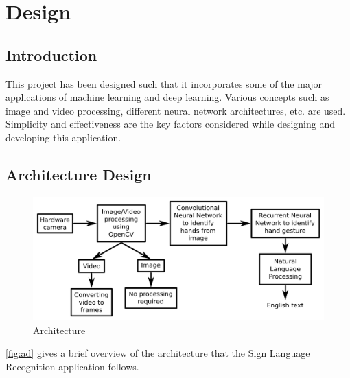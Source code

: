 \documentclass[12pt,oneside,a4paper]{article}
\begin{document}
	\section{Design}

		\subsection{Introduction}
			This project has been designed such that it incorporates some of the major applications of machine learning and deep learning. Various concepts such as image and video processing, different neural network architectures, etc. are used. Simplicity and effectiveness are the key factors considered while designing and developing this application.

		\subsection{Architecture Design}

			\begin{figure}[htp]
				\centering
				\includegraphics{architecture.png}
				\caption{Architecture}
				\label{fig:ad}
			\end{figure}

			\autoref{fig:ad} gives a brief overview of the architecture that the Sign Language Recognition application follows. \\
\end{document}

